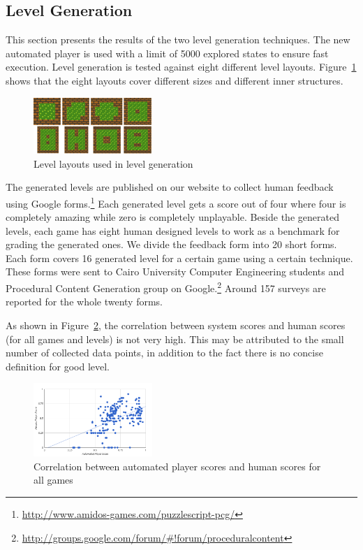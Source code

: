 \documentclass[letterpaper]{article}
\newcommand{\figref}[1]{Figure~\ref{Figure:#1}}
\begin{document}
\subsection{Level Generation}
This section presents the results of the two level generation techniques. The new automated player is used with a limit of 5000 explored states to ensure fast execution. Level generation is tested against eight different level layouts. \figref{levelLayouts} shows that the eight layouts cover different sizes and different inner structures.\\\par

\begin{figure}[ht]
  	\centering
    \includegraphics[width=0.4\textwidth]{Images/levelLayouts}
    \caption{Level layouts used in level generation}
    \label{Figure:levelLayouts}
\end{figure}

The generated levels are published on our website to collect human feedback using Google forms.\footnote{\url{http://www.amidos-games.com/puzzlescript-pcg/}} Each generated level gets a score out of four where four is completely amazing while zero is completely unplayable. Beside the generated levels, each game has eight human designed levels to work as a benchmark for grading the generated ones. We divide the feedback form into 20 short forms. Each form covers 16 generated level for a certain game using a certain technique. These forms were sent to Cairo University Computer Engineering students and Procedural Content Generation group on Google.\footnote{\url{http://groups.google.com/forum/\#!forum/proceduralcontent}} Around 157 surveys are reported for the whole twenty forms.\\\par

As shown in \figref{totalCorrelation}, the correlation between system scores and human scores (for all games and levels) is not very high. This may be attributed to the small number of collected data points, in addition to the fact there is no concise definition for good level.

\begin{figure}[ht]
  	\centering
    \includegraphics[width=0.4\textwidth]{Images/totalCorrelation}
    \caption{Correlation between automated player scores and human scores for all games}
    \label{Figure:totalCorrelation}
\end{figure}
\end{document}
